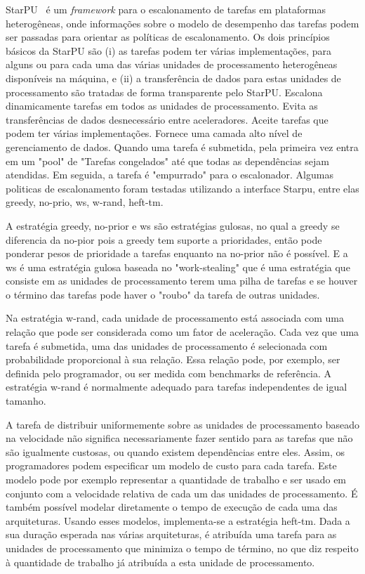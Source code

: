 StarPU~\cite{starpu} é um \textit{framework} para o escalonamento de tarefas em
plataformas heterogêneas, onde informações sobre o modelo de desempenho das
tarefas podem ser passadas para orientar as políticas de escalonamento. Os dois
princípios básicos da StarPU são (i) as tarefas podem ter várias implementações,
para alguns ou para cada uma das várias unidades de processamento heterogêneas
disponíveis na máquina, e (ii) a transferência de dados para estas unidades de
processamento são tratadas de forma transparente pelo StarPU. Escalona dinamicamente
tarefas em todos as unidades de processamento. Evita as transferências de dados  desnecessário entre aceleradores. Aceite tarefas que podem ter várias implementações. Fornece uma camada alto nível de gerenciamento de dados. Quando uma tarefa é submetida, pela primeira vez entra em um "pool" de "Tarefas congelados" até que todas as dependências sejam atendidas. Em seguida, a tarefa é "empurrado" para o escalonador. Algumas politicas de escalonamento foram testadas utilizando a interface Starpu, entre elas greedy, no-prio, ws, w-rand, heft-tm. 

A estratégia greedy, no-prior e ws são estratégias gulosas, no qual  a greedy se diferencia da no-pior pois a greedy tem suporte a prioridades, então pode ponderar pesos de prioridade a tarefas enquanto na no-prior não é possível. E a ws é uma estratégia gulosa baseada no "work-stealing" que é uma estratégia que consiste em as unidades de processamento terem uma pilha de tarefas e se houver o término das tarefas pode haver o "roubo" da tarefa de outras unidades. 

Na estratégia w-rand, cada unidade de processamento está associada com uma relação que pode ser considerada como um fator de aceleração. Cada vez que uma tarefa é submetida, uma das unidades de processamento é selecionada com probabilidade proporcional à sua relação. Essa relação pode, por exemplo, ser definida pelo programador, ou ser medida com benchmarks de referência. A estratégia w-rand é normalmente adequado para tarefas independentes de igual tamanho.

A tarefa de distribuir uniformemente sobre as unidades de processamento baseado na velocidade não significa necessariamente fazer sentido para as tarefas que não são igualmente custosas, ou quando existem dependências entre eles. Assim, os programadores podem especificar um modelo de custo para cada tarefa. Este modelo pode por exemplo representar a quantidade de trabalho e ser usado em conjunto com a velocidade relativa de cada um das unidades de processamento. É também possível modelar diretamente o tempo de execução de cada uma das arquiteturas. Usando esses modelos, implementa-se a estratégia heft-tm. Dada a sua duração esperada nas várias arquiteturas, é atribuída uma tarefa para as unidades de processamento que minimiza o tempo de término, no que diz respeito à quantidade de trabalho já atribuída a esta unidade de processamento.

